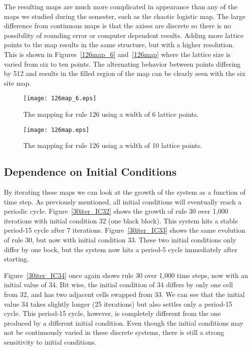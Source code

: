 The resulting maps are much more complicated in appearance than any of the maps we studied during the semester, such as the chaotic logistic map.  The large difference from continuous maps is that the axises are discrete so there is no possibility of rounding error or computer dependent results.  Adding more lattice points to the map results in the same structure, but with a higher resolution.  This is shown in Figures~\ref{126map_6} and~\ref{126map} where the lattice size is varied from six to ten points.  The alternating behavior between points differing by 512 and results in the filled region of the map can be clearly seen with the six site map.  

\begin{figure}
    \begin{minipage}[b]{0.49\textwidth}
        \centering
        \texttt{[image: 126map\_6.eps]}
        \caption{\label{30map} The mapping for rule 126 using a width of 6 lattice points.  }
    \end{minipage}
    \hspace{0.5cm}
    \begin{minipage}[b]{0.49\textwidth}
        \centering
        \texttt{[image: 126map.eps]}
        \caption{\label{30map_dot} The mapping for rule 126 using a width of 10 lattice points.}
    \end{minipage}
\end{figure}

\subsection{Dependence on Initial Conditions}

By iterating these maps we can look at the growth of the system as a function of time step.  As previously mentioned, all initial conditions will eventually reach a periodic cycle.  Figure~\ref{30iter_IC32} shows the growth of rule 30 over 1,000 iterations with initial condition 32 (one black block).  This system hits a stable period-15 cycle after 7 iterations.  Figure~\ref{30iter_IC33} shows the same evolution of rule 30, but now with initial condition 33.  These two initial conditions only differ by one bock, but the system now hits a period-5 cycle immediately after starting.  

Figure~\ref{30iter_IC34} once again shows rule 30 over 1,000 time steps, now with an initial value of 34.  Bit wise, the initial condition of 34 differs by only one cell from 32, and has two adjacent cells swapped from 33.  We can see that the initial value 34 takes slightly longer (25 iterations) but also settles only a period-15 cycle.  This period-15 cycle, however, is completely different from the one produced by a different initial condition.  Even though the initial conditions may not be continuously varied in these discrete systems, there is still a strong sensitivity to initial conditions.  

